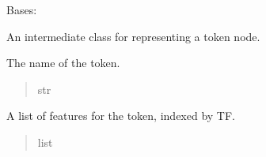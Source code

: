 \documentclass[letterpaper,10pt,english]{sphinxmanual}
\begin{document}
\begin{fulllineitems}
\label{\detokenize{nodes:nodes.nodeBuilder.Token}}
\pysigstartsignatures
\pysiglinewithargsret
{}
{\sphinxparamcomma {}\sphinxparamcomma {}}
{}
\pysigstopsignatures
\sphinxAtStartPar
Bases: {\hyperref[\detokenize{nodes:nodes.nodeBuilder.Node}]{}}

\sphinxAtStartPar
An intermediate class for representing a token node.

\begin{fulllineitems}
\label{\detokenize{nodes:nodes.nodeBuilder.Token.name}}
\pysigstartsignatures
\pysigline
{}
\pysigstopsignatures
\sphinxAtStartPar
The name of the token.
\begin{quote}\begin{description}
\sphinxAtStartPar
str

\end{description}\end{quote}

\end{fulllineitems}


\begin{fulllineitems}
\label{\detokenize{nodes:nodes.nodeBuilder.Token.features}}
\pysigstartsignatures
\pysigline
{}
\pysigstopsignatures
\sphinxAtStartPar
A list of features for the token, indexed by TF.
\begin{quote}\begin{description}
\sphinxAtStartPar
list

\end{description}\end{quote}

\end{fulllineitems}


\end{fulllineitems}
\end{document}
